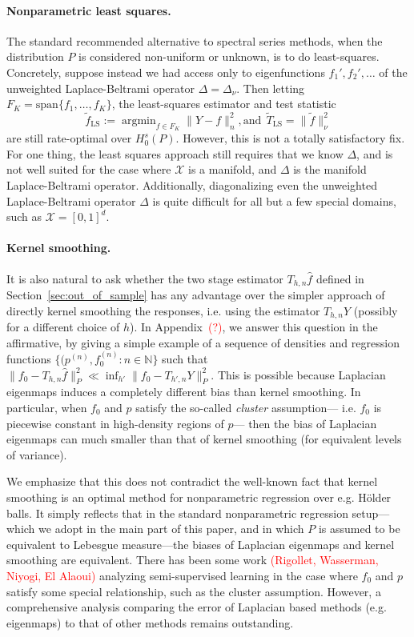 \documentclass{article}
\newcommand{\1}{\mathbf{1}}
\DeclareMathOperator*{\argmin}{argmin}
\newcommand{\mc}[1]{\mathcal{#1}}
\newcommand{\wt}[1]{\widetilde{#1}}
\newcommand{\wh}[1]{\widehat{#1}}
\theoremstyle{alden}
\theoremstyle{aldenthm}
\theoremstyle{definition}
\theoremstyle{remark}
\begin{document}
\paragraph{Nonparametric least squares.}
The standard recommended alternative to spectral series methods, when the distribution $P$ is considered non-uniform or unknown, is to do least-squares. Concretely, suppose instead we had access only to eigenfunctions $f_1',f_2',\ldots$ of the unweighted Laplace-Beltrami operator $\Delta = \Delta_{\nu}$. Then letting $F_K = \mathrm{span}\{f_1,\ldots,f_K\}$, the least-squares estimator and test statistic
\begin{equation*}
\wt{f}_{\mathrm{LS}} := \argmin_{f \in F_K} \|Y - f\|_n^2,\textrm{and}~~\wt{T}_{\mathrm{LS}} = \|\wt{f}\|_{\nu}^2
\end{equation*}
are still rate-optimal over $H_0^s(P)$. However, this is not a totally satisfactory fix. For one thing, the least squares approach still requires that we know $\Delta$, and is not well suited for the case where $\mc{X}$ is a manifold, and $\Delta$ is the manifold Laplace-Beltrami operator. Additionally, diagonalizing even the unweighted Laplace-Beltrami operator $\Delta$ is quite difficult for all but a few special domains, such as $\mc{X} = [0,1]^d$.

\paragraph{Kernel smoothing.}
It is also natural to ask whether the two stage estimator $T_{h,n}\wh{f}$ defined in Section~\ref{sec:out_of_sample} has any advantage over the simpler approach of directly kernel smoothing the responses, i.e. using the estimator $T_{h,n}Y$ (possibly for a different choice of $h$). In Appendix~\textcolor{red}{(?)}, we answer this question in the affirmative, by giving a simple example of a sequence of densities and regression functions $\{(p^{(n)}, f_0^{(n)}: n \in \mathbb{N}\}$ such that $\|f_0 - T_{h,n}\wh{f}\|_P^2 \ll \inf_{h'} \|f_0 - T_{h',n}Y\|_P^2$. This is possible because Laplacian eigenmaps induces a completely different bias than kernel smoothing. In particular, when $f_0$ and $p$ satisfy the so-called \emph{cluster} assumption--- i.e. $f_0$ is piecewise constant in high-density regions of $p$--- then the bias of Laplacian eigenmaps can much smaller than that of kernel smoothing (for equivalent levels of variance). 

We emphasize that this does not contradict the well-known fact that kernel smoothing is an optimal method for nonparametric regression over e.g. H\"{o}lder balls. It simply reflects that in the standard nonparametric regression setup---which we adopt in the main part of this paper, and in which $P$ is assumed to be equivalent to Lebesgue measure---the biases of Laplacian eigenmaps and kernel smoothing are equivalent. There has been some work \textcolor{red}{(Rigollet, Wasserman, Niyogi, El Alaoui)} analyzing semi-supervised learning in the case where $f_0$ and $p$ satisfy some special relationship, such as the cluster assumption. However, a comprehensive analysis comparing the error of Laplacian based methods (e.g. eigenmaps) to that of other methods remains outstanding.
\end{document}
